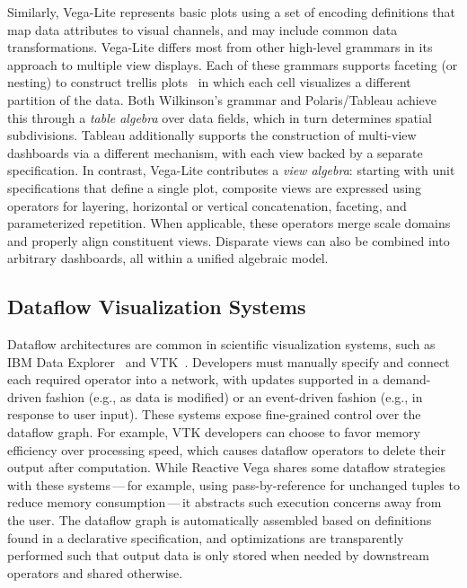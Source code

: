 Similarly, Vega-Lite represents basic plots using a set of encoding definitions
that map data attributes to visual channels, and may include common data
transformations. Vega-Lite differs most from other high-level grammars in its
approach to multiple view displays. Each of these grammars supports faceting (or
nesting) to construct trellis plots~\cite{becker:trellis} in which each cell
visualizes a different partition of the data. Both Wilkinson's grammar and
Polaris/Tableau achieve this through a \emph{table algebra} over data fields,
which in turn determines spatial subdivisions. Tableau additionally supports the
construction of multi-view dashboards via a different mechanism, with each view
backed by a separate specification. In contrast, Vega-Lite contributes a
\emph{view algebra}: starting with unit specifications that define a single
plot, composite views are expressed using operators for layering, horizontal or
vertical concatenation, faceting, and parameterized repetition. When applicable,
these operators merge scale domains and properly align constituent views.
Disparate views can also be combined into arbitrary dashboards, all within a
unified algebraic model.

\vspace{-10pt}

\subsection{Dataflow Visualization Systems}

\vspace{-10pt}

Dataflow architectures are common in scientific visualization systems, such as
IBM Data Explorer~\cite{lucas:dataflow,abram:ibmdx} and
VTK~\cite{schroeder:vtk}. Developers must manually specify and connect each
required operator into a network, with updates supported in a demand-driven
fashion (e.g., as data is modified) or an event-driven fashion (e.g., in
response to user input). These systems expose fine-grained control over the
dataflow graph. For example, VTK developers can choose to favor memory
efficiency over processing speed, which causes dataflow operators to delete
their output after computation. While Reactive Vega shares some dataflow
strategies with these systems\,---\,for example, using pass-by-reference for
unchanged tuples to reduce memory consumption\,---\,it abstracts such execution
concerns away from the user. The dataflow graph is automatically assembled based
on definitions found in a declarative specification, and optimizations are
transparently performed such that output data is only stored when needed by
downstream operators and shared otherwise.

